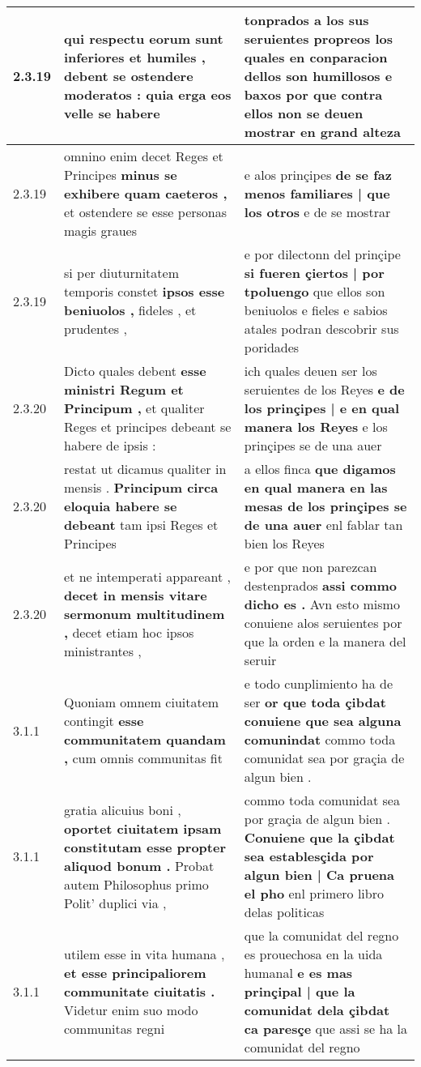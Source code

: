 \begin{tabular}{|p{1cm}|p{6.5cm}|p{6.5cm}|}
2.3.19 & qui respectu eorum sunt inferiores et humiles , \textbf{ debent se ostendere moderatos : } quia erga eos velle se habere & tonprados a los sus seruientes propreos \textbf{ los quales en conparacion dellos son humillosos e baxos } por que contra ellos non se deuen mostrar en grand alteza \\\hline
2.3.19 & omnino enim decet Reges et Principes \textbf{ minus se exhibere quam caeteros , } et ostendere se esse personas magis graues & e alos prinçipes \textbf{ de se faz menos familiares | que los otros } e de se mostrar \\\hline
2.3.19 & si per diuturnitatem temporis constet \textbf{ ipsos esse beniuolos , } fideles , et prudentes , & e por dilectonn del prinçipe \textbf{ si fueren çiertos | por tpoluengo } que ellos son beniuolos e fieles e sabios atales podran descobrir sus poridades \\\hline
2.3.20 & Dicto quales debent \textbf{ esse ministri Regum et Principum , } et qualiter Reges et principes debeant se habere de ipsis : & ich quales deuen ser los seruientes de los Reyes \textbf{ e de los prinçipes | e en qual manera los Reyes } e los prinçipes se de una auer \\\hline
2.3.20 & restat ut dicamus qualiter in mensis . \textbf{ Principum circa eloquia habere se debeant } tam ipsi Reges et Principes & a ellos finca \textbf{ que digamos en qual manera en las mesas de los prinçipes se de una auer } enl fablar tan bien los Reyes \\\hline
2.3.20 & et ne intemperati appareant , \textbf{ decet in mensis vitare sermonum multitudinem , } decet etiam hoc ipsos ministrantes , & e por que non parezcan destenprados \textbf{ assi commo dicho es . } Avn esto mismo conuiene alos seruientes por que la orden e la manera del seruir \\\hline
3.1.1 & Quoniam omnem ciuitatem contingit \textbf{ esse communitatem quandam , } cum omnis communitas fit & e todo cunplimiento ha de ser \textbf{ or que toda çibdat conuiene que sea alguna comunindat } commo toda comunidat sea por graçia de algun bien . \\\hline
3.1.1 & gratia alicuius boni , \textbf{ oportet ciuitatem ipsam constitutam esse propter aliquod bonum . } Probat autem Philosophus primo Polit’ duplici via , & commo toda comunidat sea por graçia de algun bien . \textbf{ Conuiene que la çibdat sea establesçida por algun bien | Ca pruena el pho } enl primero libro delas politicas \\\hline
3.1.1 & utilem esse in vita humana , \textbf{ et esse principaliorem communitate ciuitatis . } Videtur enim suo modo communitas regni & que la comunidat del regno es prouechosa en la uida humanal \textbf{ e es mas prinçipal | que la comunidat dela çibdat ca paresçe } que assi se ha la comunidat del regno \\\hline

\end{tabular}
